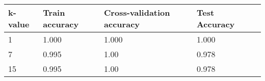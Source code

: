 \def\arraystretch{1.25}
\begin{center}
\begin{longtable}{l l l l l}
\hline
\hline
\textbf{k-value} & \textbf{Train accuracy} & \textbf{Cross-validation accuracy} & \textbf{Test Accuracy}\\
\hline
\hline
1 & 1.000 & 1.000 & 1.000 \\
7 & 0.995 & 1.00 & 0.978 \\
15 & 0.995 & 1.00 & 0.978 \\

\hline
\end{longtable}
\setcounter{table}{2}
\end{center}